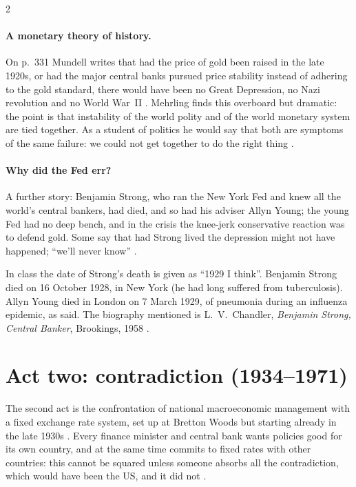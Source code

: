 \begin{paracol}{2}
\paragraph{A monetary theory of history.} On p.~331 Mundell writes that had the price of gold been raised in the late 1920s, or had the major central banks pursued
price stability instead of adhering to the gold standard, there would have been no Great Depression, no Nazi revolution and no World War~II
. Mehrling finds this overboard but dramatic: the point is that instability of the world polity and of the world
monetary system are tied together. As a student of politics he would say that both are symptoms of the same failure: we could not get together to do the right
thing .

\paragraph{Why did the Fed err?} A further story: Benjamin Strong, who ran the New York Fed and knew all the world's central bankers, had died, and so had his adviser
Allyn Young; the young Fed had no deep bench, and in the crisis the knee-jerk conservative reaction was to defend gold. Some say that had Strong lived the
depression might not have happened; ``we'll never know'' .

\begin{coursenote}
In class the date of Strong's death is given as ``1929 I think''. Benjamin Strong died on 16 October 1928, in New York (he had long suffered from
tuberculosis). Allyn Young died in London on 7 March 1929, of pneumonia during an influenza epidemic, as said. The biography mentioned is L.~V.~Chandler,
\emph{Benjamin Strong, Central Banker}, Brookings, 1958 .
\end{coursenote}

\section{Act two: contradiction (1934--1971)}\label{sec:intl-act2}

The second act is the confrontation of national macroeconomic management with a fixed exchange rate system, set up at Bretton Woods but starting already in
the late 1930s . Every finance minister and central bank wants policies good for its own country, and at the same
time commits to fixed rates with other countries: this cannot be squared unless someone absorbs all the contradiction, which would have been the US, and it
did not .


\end{paracol}
